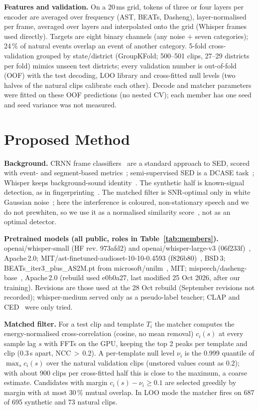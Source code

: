 \documentclass[conference]{IEEEtran}
\begin{document}
\textbf{Features and validation.} On a 20\,ms grid, tokens of three or four layers per encoder are averaged over
frequency (AST, BEATs, Dasheng), layer-normalised per frame, averaged over layers and interpolated onto the grid
(Whisper frames used directly). Targets are eight binary channels (any noise + seven categories); 24\,\% of
natural events overlap an event of another category. 5-fold cross-validation grouped by state/district
(GroupKFold; 500--501 clips, 27--29 districts per fold) mimics unseen test districts; every validation number is
out-of-fold (OOF) with the test decoding, LOO library and cross-fitted null levels (two halves of the natural clips
calibrate each other). Decode and matcher parameters were fitted on these OOF predictions (no nested CV); each
member has one seed and seed variance was not measured.

\section{Proposed Method}
\textbf{Background.} CRNN frame classifiers~\cite{cakir,mesaros} are a standard approach to SED, scored with event-
and segment-based metrics~\cite{sedmetrics}; semi-supervised SED is a DCASE task~\cite{dcase}; Whisper keeps
background-sound identity~\cite{whisperat}. The synthetic half is known-signal detection, as in
fingerprinting~\cite{wang}. The matched filter is SNR-optimal only in white Gaussian noise~\cite{turin}; here the
interference is coloured, non-stationary speech and we do not prewhiten, so we use it as a normalised similarity
score~\cite{lewis}, not as an optimal detector.

\textbf{Pretrained models (all public, roles in Table~\ref{tab:members}).} openai/whisper-small (HF rev.
973afd2) and openai/whisper-large-v3 (06f233f)~\cite{whisper}, Apache\,2.0; MIT/ast-finetuned-audioset-10-10-0.4593
(f826b80)~\cite{ast}, BSD\,3; BEATs\_iter3\_plus\_AS2M.pt from microsoft/unilm~\cite{beats}, MIT;
mispeech/dasheng-base~\cite{dasheng}, Apache\,2.0 (rebuild used e0b0a27, last modified 25 Oct 2026, after our
training). Revisions are those used at the 28 Oct rebuild (September revisions not recorded); whisper-medium
served only as a pseudo-label teacher; CLAP and CED~\cite{ced} were only tried.

\textbf{Matched filter.}\label{sec:tpl} For a test clip and template $T_i$ the matcher computes the
energy-normalised cross-correlation (cosine, no mean removal) $c_i(s)$ at every sample lag $s$ with FFTs on the
GPU, keeping the top 2 peaks per template and clip (0.3\,s apart, NCC\,$>$\,0.2). A per-template null level
$\nu_i$ is the 0.999 quantile of $\max_s c_i(s)$ over the natural validation clips (unstored values count as 0.2);
with about 900 clips per cross-fitted half this is close to the maximum, a coarse estimate. Candidates with margin
$c_i(s)-\nu_i\ge0.1$ are selected greedily by margin with at most 30\,\% mutual overlap. In LOO mode the matcher
fires on 687 of 695 synthetic and 73 natural clips.
\end{document}
